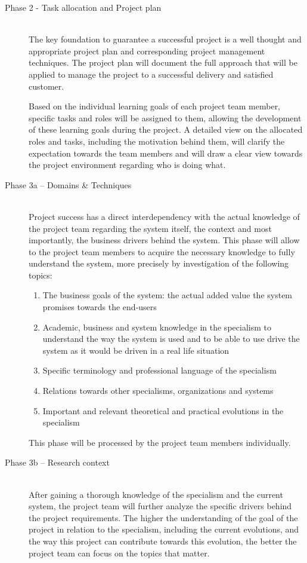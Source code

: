  \begin{description}
	\item [Phase 2 - Task allocation and Project plan]~\\
		The key foundation to guarantee a successful project is a well thought and appropriate project plan and corresponding project management techniques.
		The project plan will document the full approach that will be applied to manage the project to a successful delivery and satisfied customer.
		
		Based on the individual learning goals of each project team member, specific tasks and roles will be assigned to them, allowing the development of these learning goals during the project.
		A detailed view on the allocated roles and tasks, including the motivation behind them, will clarify the expectation towards the team members and will draw a clear view towards the project environment regarding who is doing what.
	\item [Phase 3a -- Domains \& Techniques]~\\
		Project success has a direct interdependency with the actual knowledge of the project team regarding the system itself, the context and most importantly, the business drivers behind the system.
		This phase will allow to the project team members to acquire the necessary knowledge to fully understand  the system, more precisely by investigation of the following topics:

 		\begin{enumerate}
			\item The business goals of the system: the actual added value the system promises towards the end-users
			\item Academic, business and system knowledge in the specialism to understand the way the system is used and to be able to use drive the system as it would be driven in a real life situation
			\item Specific terminology and professional language of the specialism
			\item Relations towards other specialisms, organizations and systems
			\item Important and relevant theoretical and practical evolutions in the specialism
		\end {enumerate}

		This phase will be processed by the project team members individually.
 	\item [Phase 3b -- Research context]~\\
		After gaining a thorough knowledge of the specialism and the current system, the project team will further analyze the specific drivers behind the project requirements.
		The higher the understanding of the goal of the project in relation to the specialism, including the current evolutions, and the way this project can contribute towards this evolution, the better the project team can focus on the topics that matter.
	

\end{description}
